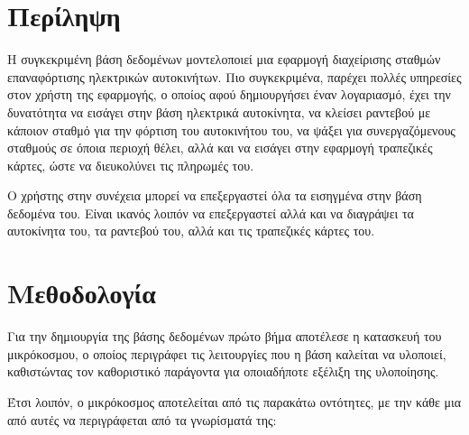 \documentclass[manuscript,screen,review]{acmart}
\begin{document}
\newpage

\section{Περίληψη}

 Η συγκεκριμένη βάση δεδομένων μοντελοποιεί μια εφαρμογή διαχείρισης σταθμών επαναφόρτισης 
 ηλεκτρικών αυτοκινήτων. Πιο συγκεκριμένα, παρέχει πολλές υπηρεσίες στον χρήστη της εφαρμογής, 
 ο οποίος αφού δημιουργήσει έναν λογαριασμό, έχει την δυνατότητα να εισάγει στην βάση 
 ηλεκτρικά αυτοκίνητα, να κλείσει ραντεβού με κάποιον σταθμό για την φόρτιση του αυτοκινήτου 
 του, να ψάξει για συνεργαζόμενους σταθμούς σε όποια περιοχή θέλει, αλλά και να εισάγει στην 
 εφαρμογή τραπεζικές κάρτες, ώστε να διευκολύνει τις πληρωμές του.
 
 Ο χρήστης στην συνέχεια μπορεί να επεξεργαστεί όλα τα εισηγμένα στην βάση δεδομένα
 του. Είναι ικανός λοιπόν να επεξεργαστεί αλλά και να διαγράψει τα αυτοκίνητα του, 
 τα ραντεβού του, αλλά και τις τραπεζικές κάρτες του.
 
\section{Μεθοδολογία}
 
 Για την δημιουργία της βάσης δεδομένων πρώτο βήμα αποτέλεσε η κατασκευή του μικρόκοσμου, 
 ο οποίος περιγράφει τις λειτουργίες που η βάση καλείται να υλοποιεί, καθιστώντας τον 
 καθοριστικό παράγοντα για οποιαδήποτε εξέλιξη της υλοποίησης.
 
 Έτσι λοιπόν, ο μικρόκοσμος αποτελείται από τις παρακάτω οντότητες, με την κάθε μια από
 αυτές να περιγράφεται από τα γνωρίσματά της:
 
\end{document}

